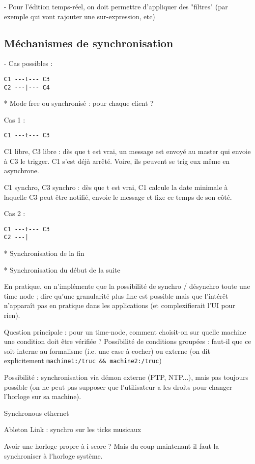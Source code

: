 \documentclass{article}
\begin{document}
- Pour l'édition temps-réel, on doit permettre d'appliquer des "filtres" (par exemple qui vont rajouter une sur-expression, etc)
\subsection{Méchanismes de synchronisation}
- Cas possibles : 

\begin{lstlisting}
C1 ---t--- C3
C2 ---|--- C4
\end{lstlisting}
* Mode free ou synchronisé : pour chaque client ? 

Cas 1 : 
\begin{lstlisting}
C1 ---t--- C3
\end{lstlisting}
C1 libre, C3 libre : dès que t est vrai, un message est envoyé au master qui envoie à C3 le trigger. C1 s'est déjà arrêté.
Voire, ils peuvent se trig eux même en asynchrone.

C1 synchro, C3 synchro : dès que t est vrai, C1 calcule la date minimale à laquelle C3 peut être notifié, envoie le message et fixe ce temps de son côté.

Cas 2 : 
\begin{lstlisting}
C1 ---t--- C3
C2 ---|
\end{lstlisting}

* Synchronisation de la fin

* Synchronisation du début de la suite

En pratique, on n'implémente que la possibilité de synchro / désynchro toute une time node ; dire qu'une granularité plus fine est possible mais que l'intérêt n'apparaît pas en pratique dans les applications (et complexifierait l'UI pour rien).

Question principale : pour un time-node, comment choisit-on sur quelle machine une condition doit être vérifiée ? Possibilité de conditions groupées : faut-il que ce soit interne au formalisme (i.e. une case à cocher) ou externe (on dit explicitement \lstinline|machine1:/truc && machine2:/truc|)

Possibilité : synchronisation via démon externe (PTP, NTP...), mais pas toujours possible (on ne peut pas supposer que l'utilisateur a les droits pour changer l'horloge sur sa machine).

Synchronous ethernet

Ableton Link : synchro sur les ticks musicaux 

Avoir une horloge propre à i-score ? Mais du coup maintenant il faut la synchroniser à l'horloge système. 
\end{document}
